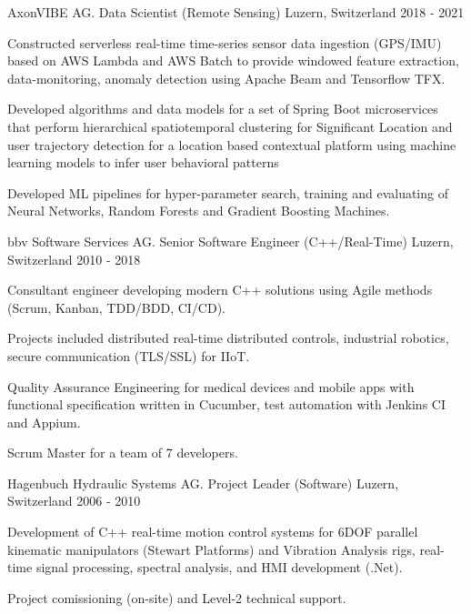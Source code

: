 \begin{cventries}
\cventry
  {AxonVIBE AG.} %
  {Data Scientist (Remote Sensing)} %
  {Luzern, Switzerland} %
  {2018 - 2021} %
  {
    \begin{cvitems} %
      \item {
          Constructed serverless real-time time-series sensor data ingestion (GPS/IMU) based on AWS Lambda and AWS Batch to 
          provide windowed feature extraction, data-monitoring, anomaly detection using 
          Apache Beam and Tensorflow TFX.}
      \item {
          Developed algorithms and data models for a set of Spring Boot microservices that perform hierarchical 
          spatiotemporal clustering for Significant Location and user trajectory detection for a location based contextual platform
          using machine learning models to infer user behavioral patterns}
      \item {
          Developed ML pipelines for hyper-parameter search, training and evaluating of Neural Networks, Random Forests and Gradient Boosting Machines.}
    \end{cvitems}
  }

\cventry
{bbv Software Services AG.} %
{Senior Software Engineer (C++/Real-Time)} %
{Luzern, Switzerland} %
{2010 - 2018} %
{
  \begin{cvitems} %
    \item {
        Consultant engineer developing modern C++ solutions using 
        Agile methods (Scrum, Kanban, TDD/BDD, CI/CD).}
      \item{
        Projects included distributed real-time distributed
        controls, industrial robotics, secure communication (TLS/SSL)
        for IIoT.}
    \item {
        Quality Assurance Engineering for medical devices and mobile apps
        with functional specification written in Cucumber, 
        test automation with Jenkins CI and Appium. 
        }
    \item {
        Scrum Master for a team of 7 developers.
        }
  \end{cvitems}
}

\cventry
{Hagenbuch Hydraulic Systems AG.} %
{Project Leader (Software)} %
{Luzern, Switzerland} %
{2006 - 2010} %
{
  \begin{cvitems} %
    \item {
        Development of C++ real-time motion control systems for 6DOF parallel 
        kinematic manipulators (Stewart Platforms) and Vibration Analysis rigs,
        real-time signal processing, spectral analysis, and HMI development (.Net).}
    \item {
        Project comissioning (on-site) and Level-2 technical support.}
  \end{cvitems}
}


\end{cventries}

